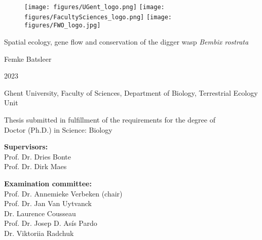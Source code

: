 \documentclass[10pt, twoside]{book} %
\begin{document}
	
	\newpage{\thispagestyle{empty}\cleardoublepage}
	\color{black}
	\newpage 
	\thispagestyle{empty}
\begin{center}
			\thispagestyle{empty}
			
			\begin{figure}[h!]
				\centering
				\texttt{[image: figures/UGent\_logo.png]}\hfill
				\texttt{[image: figures/FacultySciences\_logo.png]}\hfill
				\texttt{[image: figures/FWO\_logo.jpg]}
				\end{figure}
			
			\vspace*{3.50cm}
			
			{\Large Spatial ecology, gene flow and conservation of the digger wasp \textit{Bembix rostrata}}

			
			\vspace{5.5 cm}
			
			{\normalsize Femke Batsleer} 
			
			\vspace{1.0 cm}
			
			{\normalsize 2023}	
			
			\vspace{2.0 cm}
			
			{\footnotesize Ghent University, Faculty of Sciences, Department of Biology, Terrestrial Ecology Unit}
			
			\vspace{0.5cm}
			
			{\footnotesize Thesis submitted in fulfillment of the requirements for the degree of\\
 			Doctor (Ph.D.) in Science: Biology}

\end{center}
\newpage
		
	\color{black}
	\newpage 
	\thispagestyle{empty}

		
	{\small \noindent \textbf{Supervisors:} \\
			\hspace{10mm}Prof. Dr. Dries Bonte\\
			\hspace{10mm}Prof. Dr. Dirk Maes}\\

	\vspace*{1.0cm}
	
	{\small \noindent \textbf{Examination committee:}\\
		\hspace{10mm}Prof. Dr. Annemieke Verbeken (chair) \\
		\hspace{10mm}Prof. Dr. Jan Van Uytvanck\\
		\hspace{10mm}Dr. Laurence Cousseau\\
		\hspace{10mm}Prof. Dr. Josep D. Asís Pardo\\
		\hspace{10mm}Dr. Viktoriia Radchuk} \\
	
\end{document}
